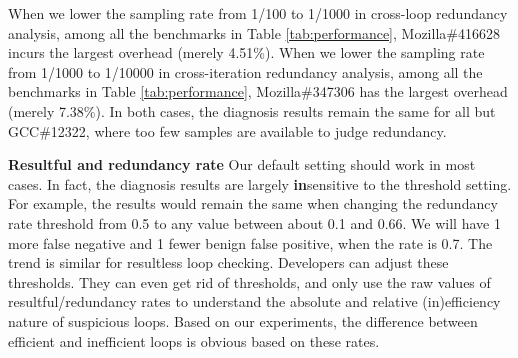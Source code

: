 When we lower the sampling rate from 1/100 to 1/1000 
in cross-loop redundancy analysis,
among all the benchmarks in Table \ref{tab:performance},
Mozilla\#416628 incurs the largest overhead (merely 4.51\%). 
When we lower the sampling rate from 1/1000 to 1/10000
in cross-iteration redundancy analysis,
among all the benchmarks in Table \ref{tab:performance},
Mozilla\#347306 has the largest overhead (merely 7.38\%). 
In both cases,
the diagnosis results remain 
the same for all but GCC\#12322, where too few samples are available
to judge redundancy.

\noindent\textbf{Resultful and redundancy rate}
Our default setting should work in most cases.
In fact, the diagnosis results are largely {\bf in}sensitive to the threshold
setting. For example, the results would remain the same when
changing the redundancy rate threshold from 0.5 to any value between about
0.1 and 0.66. We will have 1 more false negative and 1 fewer benign false positive, 
when the rate is 0.7. The trend is similar for resultless loop checking. 
Developers can adjust these thresholds. 
They can even get rid of thresholds, and only
use the raw values of resultful/redundancy rates to understand
the absolute and relative (in)efficiency nature of suspicious 
loops. Based on our experiments, the difference between efficient and inefficient
loops is obvious based on these rates.


